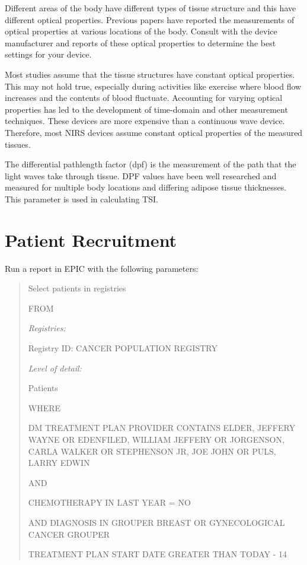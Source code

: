 \documentclass[
]{book}
\begin{document}
Different areas of the body have different types of tissue structure and this have different optical properties. Previous papers have reported the measurements of optical properties at various locations of the body. Consult with the device manufacturer and reports of these optical properties to determine the best settings for your device.

Most studies assume that the tissue structures have constant optical properties. This may not hold true, especially during activities like exercise where blood flow increases and the contents of blood fluctuate. Accounting for varying optical properties has led to the development of time-domain and other measurement techniques. These devices are more expensive than a continuous wave device. Therefore, most NIRS devices assume constant optical properties of the measured tissues.

The differential pathlength factor (dpf) is the measurement of the path that the light waves take through tissue. DPF values have been well researched and measured for multiple body locations and differing adipose tissue thicknesses. This parameter is used in calculating TSI.

\hypertarget{PatientRecruitment}{%
\chapter{Patient Recruitment}\label{PatientRecruitment}}

Run a report in EPIC with the following parameters:

\begin{quote}
Select patients in registries

FROM

\emph{Registries:}

Registry ID: CANCER POPULATION REGISTRY

\emph{Level of detail:}

Patients

WHERE

DM TREATMENT PLAN PROVIDER CONTAINS ELDER, JEFFERY WAYNE OR EDENFILED, WILLIAM JEFFERY OR JORGENSON, CARLA WALKER OR STEPHENSON JR, JOE JOHN OR PULS, LARRY EDWIN

AND

CHEMOTHERAPY IN LAST YEAR = NO

AND DIAGNOSIS IN GROUPER BREAST OR GYNECOLOGICAL CANCER GROUPER

TREATMENT PLAN START DATE GREATER THAN TODAY - 14
\end{quote}
\end{document}
